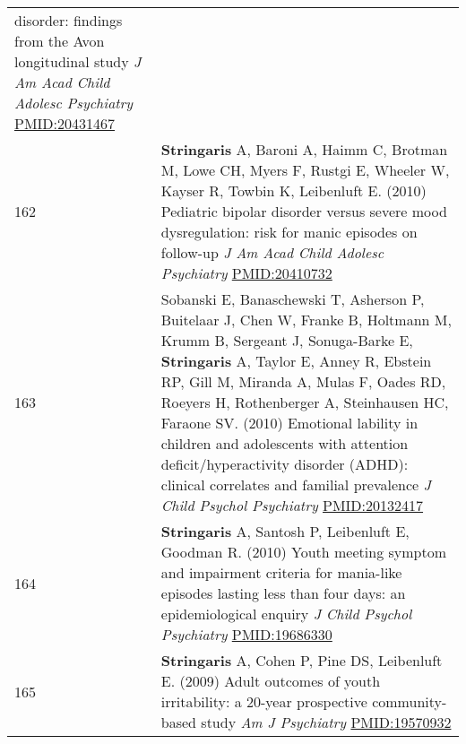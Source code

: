 \documentclass[
]{article}
\begin{document}
\begin{longtable}[]{@{}ll@{}}
\begin{minipage}[t]{0.94\columnwidth}
disorder: findings from the Avon longitudinal study \emph{J Am Acad
Child Adolesc Psychiatry} \url{PMID:20431467}\strut
\end{minipage}\tabularnewline
\begin{minipage}[t]{0.01\columnwidth}\raggedright
162\strut
\end{minipage} & \begin{minipage}[t]{0.94\columnwidth}\raggedright
\textbf{Stringaris} A, Baroni A, Haimm C, Brotman M, Lowe CH, Myers F,
Rustgi E, Wheeler W, Kayser R, Towbin K, Leibenluft E. (2010) Pediatric
bipolar disorder versus severe mood dysregulation: risk for manic
episodes on follow-up \emph{J Am Acad Child Adolesc Psychiatry}
\url{PMID:20410732}\strut
\end{minipage}\tabularnewline
\begin{minipage}[t]{0.01\columnwidth}\raggedright
163\strut
\end{minipage} & \begin{minipage}[t]{0.94\columnwidth}\raggedright
Sobanski E, Banaschewski T, Asherson P, Buitelaar J, Chen W, Franke B,
Holtmann M, Krumm B, Sergeant J, Sonuga-Barke E, \textbf{Stringaris} A,
Taylor E, Anney R, Ebstein RP, Gill M, Miranda A, Mulas F, Oades RD,
Roeyers H, Rothenberger A, Steinhausen HC, Faraone SV. (2010) Emotional
lability in children and adolescents with attention
deficit/hyperactivity disorder (ADHD): clinical correlates and familial
prevalence \emph{J Child Psychol Psychiatry} \url{PMID:20132417}\strut
\end{minipage}\tabularnewline
\begin{minipage}[t]{0.01\columnwidth}\raggedright
164\strut
\end{minipage} & \begin{minipage}[t]{0.94\columnwidth}\raggedright
\textbf{Stringaris} A, Santosh P, Leibenluft E, Goodman R. (2010) Youth
meeting symptom and impairment criteria for mania-like episodes lasting
less than four days: an epidemiological enquiry \emph{J Child Psychol
Psychiatry} \url{PMID:19686330}\strut
\end{minipage}\tabularnewline
\begin{minipage}[t]{0.01\columnwidth}\raggedright
165\strut
\end{minipage} & \begin{minipage}[t]{0.94\columnwidth}\raggedright
\textbf{Stringaris} A, Cohen P, Pine DS, Leibenluft E. (2009) Adult
outcomes of youth irritability: a 20-year prospective community-based
study \emph{Am J Psychiatry} \url{PMID:19570932}\strut

\end{minipage}
\end{longtable}
\end{document}
